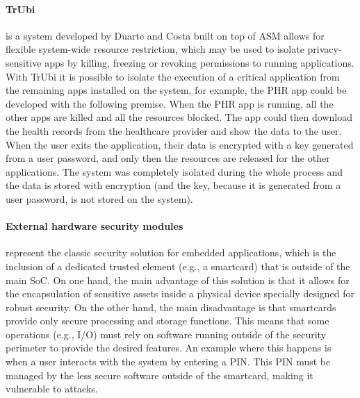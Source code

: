 \paragraph{\textbf{TrUbi}} is a system developed by Duarte \cite{nunoduarte} and Costa \cite{miguelcosta} built on top of ASM \cite{heuser2014asm} allows for flexible system-wide resource restriction, which may be used to isolate privacy-sensitive apps by killing, freezing or revoking permissions to running applications. With TrUbi it is possible to isolate the execution of a critical application from the remaining apps installed on the system, for example, the \ac{PHR} app could be developed with the following premise. When the \ac{PHR} app is running, all the other apps are killed and all the resources blocked. The app could then download the health records from the healthcare provider and show the data to the user. When the user exits the application, their data is encrypted with a key generated from a user password, and only then the resources are released for the other applications. The system was completely isolated during the whole process and the data is stored with encryption (and the key, because it is generated from a user password, is not stored on the system).

\paragraph{\textbf{External hardware security modules}} represent the classic security solution for embedded applications, which is the inclusion of a dedicated trusted element (e.g., a smartcard) that is outside of the main \ac{SoC}. On one hand, the main advantage of this solution is that it allows for the encapsulation of sensitive assets inside a physical device specially designed for robust security. On the other hand, the main disadvantage is that smartcards provide only secure processing and storage functions. This means that some operations (e.g., I/O) must rely on software running outside of the security perimeter to provide the desired features. An example where this happens is when a user interacts with the system by entering a \ac{PIN}. This \ac{PIN} must be managed by the less secure software outside of the smartcard, making it vulnerable to attacks.

